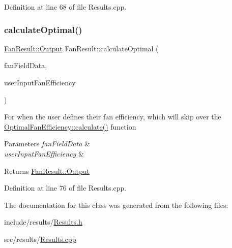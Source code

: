 Definition at line 68 of file Results.\+cpp.

\mbox{\label{class_fan_result_a477db4149cd45079cf03ef903ce7e2b8}} 
\subsubsection{\texorpdfstring{calculate\+Optimal()}{calculateOptimal()}\hspace{0.1cm}{\footnotesize\ttfamily [2/2]}}
{\footnotesize\ttfamily \hyperlink{struct_fan_result_1_1_output}{Fan\+Result\+::\+Output} Fan\+Result\+::calculate\+Optimal (\begin{DoxyParamCaption}\item[{\hyperlink{struct_fan_1_1_field_data_modified_and_optimal}{Fan\+::\+Field\+Data\+Modified\+And\+Optimal} const \&}]{fan\+Field\+Data,  }\item[{double}]{user\+Input\+Fan\+Efficiency }\end{DoxyParamCaption})}

For when the user defines their fan efficiency, which will skip over the \hyperlink{class_optimal_fan_efficiency_ac35291d1095c74373393ac510e45ae02}{Optimal\+Fan\+Efficiency\+::calculate()} function 
\begin{DoxyParams}{Parameters}
{\em fan\+Field\+Data} & \\
\hline
{\em user\+Input\+Fan\+Efficiency} & \\
\hline
\end{DoxyParams}
\begin{DoxyReturn}{Returns}
\hyperlink{struct_fan_result_1_1_output}{Fan\+Result\+::\+Output} 
\end{DoxyReturn}


Definition at line 76 of file Results.\+cpp.



The documentation for this class was generated from the following files\+:\begin{DoxyCompactItemize}
\item 
include/results/\hyperlink{_results_8h}{Results.\+h}\item 
src/results/\hyperlink{_results_8cpp}{Results.\+cpp}\end{DoxyCompactItemize}
